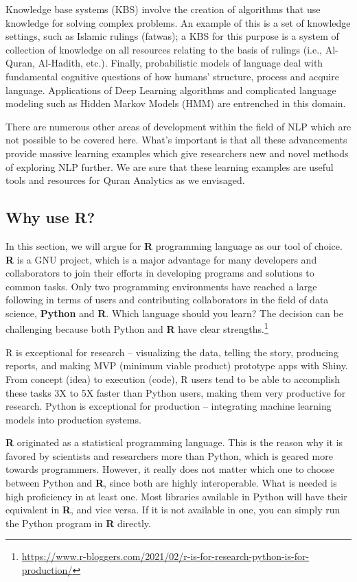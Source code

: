 \documentclass[
]{article}
\begin{document}
Knowledge base systems (KBS) involve the creation of algorithms that use knowledge for solving complex problems. An example of this is a set of knowledge settings, such as Islamic rulings (fatwas); a KBS for this purpose is a system of collection of knowledge on all resources relating to the basis of rulings (i.e., Al-Quran, Al-Hadith, etc.). Finally, probabilistic models of language deal with fundamental cognitive questions of how humans' structure, process and acquire language. Applications of Deep Learning algorithms and complicated language modeling such as Hidden Markov Models (HMM) are entrenched in this domain.

There are numerous other areas of development within the field of NLP which are not possible to be covered here. What's important is that all these advancements provide massive learning examples which give researchers new and novel methods of exploring NLP further. We are sure that these learning examples are useful tools and resources for Quran Analytics as we envisaged.

\hypertarget{why-use-R}{%
\subsection{Why use R?}\label{why-use-R}}

In this section, we will argue for \textbf{R} programming language as our tool of choice. \textbf{R} is a GNU project, which is a major advantage for many developers and collaborators to join their efforts in developing programs and solutions to common tasks. Only two programming environments have reached a large following in terms of users and contributing collaborators in the field of data science, \textbf{Python} and \textbf{R}. Which language should you learn? The decision can be challenging because both Python and \textbf{R} have clear strengths.\footnote{\url{https://www.r-bloggers.com/2021/02/r-is-for-research-python-is-for-production/}}

R is exceptional for research -- visualizing the data, telling the story, producing reports, and making MVP (minimum viable product) prototype apps with Shiny. From concept (idea) to execution (code), R users tend to be able to accomplish these tasks 3X to 5X faster than Python users, making them very productive for research. Python is exceptional for production -- integrating machine learning models into production systems.

\textbf{R} originated as a statistical programming language. This is the reason why it is favored by scientists and researchers more than Python, which is geared more towards programmers. However, it really does not matter which one to choose between Python and \textbf{R}, since both are highly interoperable. What is needed is high proficiency in at least one. Most libraries available in Python will have their equivalent in \textbf{R}, and vice versa. If it is not available in one, you can simply run the Python program in \textbf{R} directly.
\end{document}
